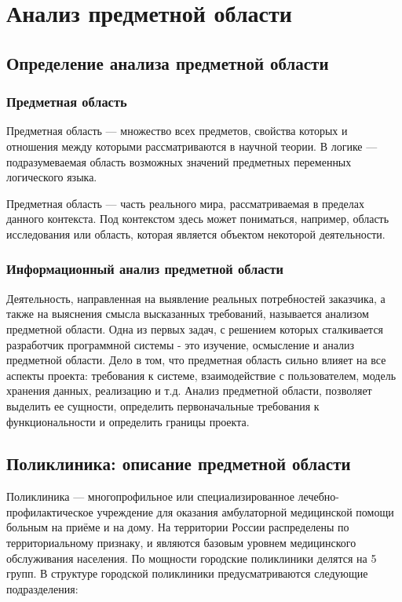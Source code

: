 \documentclass[14pt,a4paper,russian]{extreport}
\begin{document}
\addtocounter{page}{1}


\tableofcontents{}

\newpage

\sloppy

\chapter{Анализ предметной области}

\section{Определение анализа предметной области}

\subsection{Предметная область}
Предметная область — множество всех предметов, свойства которых и отношения между которыми
рассматриваются в научной теории. В логике — подразумеваемая область возможных значений предметных
переменных логического языка.

Предметная область — часть реального мира, рассматриваемая в пределах данного контекста. Под
контекстом здесь может пониматься, например, область исследования или область, которая является
объектом некоторой деятельности.\cite{domainknowladge}

\subsection{Информационный анализ предметной области}
Деятельность, направленная на выявление реальных потребностей заказчика, а также на выяснения
смысла высказанных требований, называется анализом предметной области.
Одна из первых задач, с решением которых сталкивается разработчик программной системы - это
изучение, осмысление и анализ предметной области. Дело в том, что предметная область сильно влияет
на все аспекты проекта: требования к системе, взаимодействие с пользователем, модель хранения
данных, реализацию и т.д.  Анализ предметной области, позволяет выделить ее сущности, определить
первоначальные требования к функциональности и определить границы проекта.


\section{Поликлиника: описание предметной области}
Поликлиника — многопрофильное или специализированное лечебно-профилактическое учреждение для
оказания амбулаторной медицинской помощи больным на приёме и на дому.  На территории России
распределены по территориальному признаку, и являются базовым уровнем медицинского обслуживания
населения.  По мощности городские поликлиники делятся на 5 групп. В структуре городской поликлиники
предусматриваются следующие подразделения:
\end{document}

